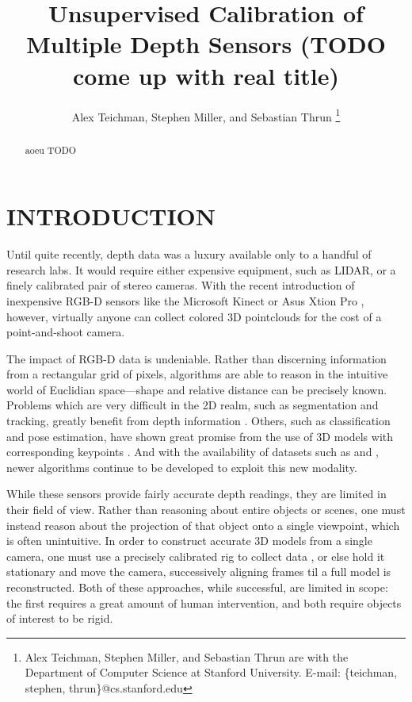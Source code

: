 \documentclass[letterpaper, 10 pt, conference]{ieeeconf}  %
\title{\LARGE \bf
Unsupervised Calibration of Multiple Depth Sensors (TODO come up with real title)}
\author{Alex Teichman, Stephen Miller, and Sebastian Thrun
\thanks{Alex Teichman, Stephen Miller, and Sebastian Thrun are with the Department of Computer Science at Stanford University. \newline E-mail: \{teichman, stephen, thrun\}@cs.stanford.edu } }
\begin{document}
\maketitle
\thispagestyle{empty}
\pagestyle{empty}


\begin{abstract}
aoeu
TODO
\end{abstract}


\section{INTRODUCTION}

Until quite recently, depth data was a luxury available only to a handful of research labs. It would require 
either expensive equipment, such as LIDAR, or a finely calibrated pair of stereo cameras. With the recent 
introduction of inexpensive RGB-D sensors like the Microsoft Kinect \cite{kinect} or Asus Xtion Pro \cite{xtion}, 
however, virtually anyone can collect colored 3D pointclouds for the cost of a point-and-shoot camera.

The impact of RGB-D data is undeniable. Rather than discerning information from a rectangular grid of pixels, algorithms 
are able to reason in the intuitive world of Euclidian space---shape and relative distance can be precisely known. 
Problems which are very difficult in the 2D realm, such as segmentation and tracking, greatly benefit from depth 
information \cite{rgbdtracking}.  Others, such as classification and pose estimation, have shown great promise 
from the use of 3D models with corresponding keypoints \cite{rgbdclassification}.
And with the availability of datasets such as \cite{rgbd-dataset} and \cite{nist-dataset}, newer algorithms continue to 
be developed to exploit this new modality.

While these sensors provide fairly accurate depth readings, they are limited in their field of view. Rather than reasoning 
about entire objects or scenes, one must instead reason about the projection of that object onto a single viewpoint, which is often unintuitive. In order to 
construct accurate 3D models from a single camera, one must use a precisely calibrated rig to collect 
data \cite{solutionsinperception}, or else hold it stationary and move the camera, successively aligning frames til a 
full model is reconstructed. Both of these approaches, while successful, are limited in scope: the first requires a 
great amount of human intervention, and both require objects of interest to be rigid.
\end{document}
